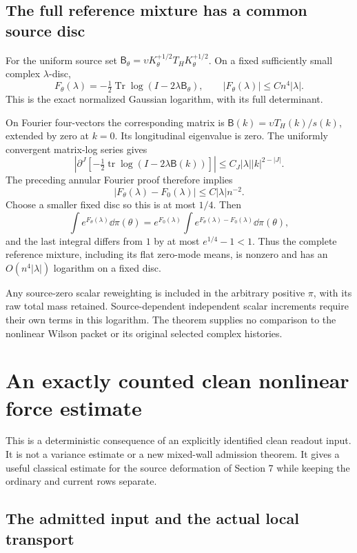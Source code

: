 \documentclass[11pt,letterpaper]{article}
\theoremstyle{remark}\newtheorem{remark}[theorem]{Remark}
\newcommand{\tr}{\operatorname{tr}}
\newcommand{\Tr}{\operatorname{Tr}}
\begin{document}
\subsection{The full reference mixture has a common source disc}

For the uniform source set
\(\mathsf B_\theta=\upsilon K_\theta^{+1/2}T_HK_\theta^{+1/2}\).
On a fixed sufficiently small complex \(\lambda\)-disc,
\[
 F_\theta(\lambda)
 =-\tfrac12\Tr\log(I-2\lambda\mathsf B_\theta),\qquad
 |F_\theta(\lambda)|\le Cn^4|\lambda|.
\]
This is the exact normalized Gaussian logarithm, with its full determinant.

On Fourier four-vectors the corresponding matrix is
\(\mathsf B(k)=\upsilon T_H(k)/s(k)\), extended by zero at \(k=0\). Its longitudinal eigenvalue is zero. The uniformly convergent matrix-log series gives
\[
 |\partial^J[-\tfrac12\tr\log(I-2\lambda\mathsf B(k))]|
 \le C_J|\lambda||k|^{2-|J|}.
\]
The preceding annular Fourier proof therefore implies
\[
 |F_\theta(\lambda)-F_0(\lambda)|\le C|\lambda|n^{-2}.
\]
Choose a smaller fixed disc so this is at most \(1/4\). Then
\[
 \int e^{F_\theta(\lambda)}\dd\pi(\theta)
 =e^{F_0(\lambda)}
 \int e^{F_\theta(\lambda)-F_0(\lambda)}\dd\pi(\theta),
\]
and the last integral differs from \(1\) by at most \(e^{1/4}-1<1\). Thus the complete reference mixture, including its flat zero-mode means, is nonzero and has an \(O(n^4|\lambda|)\) logarithm on a fixed disc.

Any source-zero scalar reweighting is included in the arbitrary positive \(\pi\), with its raw total mass retained. Source-dependent independent scalar increments require their own terms in this logarithm. The theorem supplies no comparison to the nonlinear Wilson packet or its original selected complex histories.

\section{An exactly counted clean nonlinear force estimate}\label{app:clean}

This is a deterministic consequence of an explicitly identified clean readout input. It is not a variance estimate or a new mixed-wall admission theorem. It gives a useful classical estimate for the source deformation of Section 7 while keeping the ordinary and current rows separate.

\subsection{The admitted input and the actual local transport}
\end{document}
